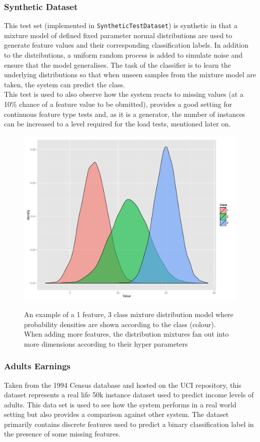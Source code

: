 \documentclass[a4paper,11pt]{scrreprt}
\begin{document}
\subsubsection{Synthetic Dataset}
This test set (implemented in \verb|SyntheticTestDataset|) is synthetic in that a mixture model of defined fixed parameter normal distributions are used to generate feature values and their corresponding classification labels. In addition to the distributions, a uniform random process is added to simulate noise and ensure that the model generalises. The task of the classifier is to learn the underlying distributions so that when unseen samples from the mixture model are taken, the system can predict the class.\\ This test is used to also observe how the system reacts to missing values (at a 10\% chance of a feature value to be obmitted), provides a good setting for continuous feature type tests and, as it is a generator, the number of instances can be increased to a level required for the load tests, mentioned later on.
\begin{figure}[h!]
\centering
\caption{An example of a 1 feature, 3 class mixture distribution model where probability densities are shown according to the class (colour). When adding more features, the distribution mixtures fan out into more dimensions according to their hyper parameters}
\includegraphics[scale=0.35, trim=0 0 0 0, clip=true] {synthetic-class-distributions.pdf}
\label{fig:indexes}
\end{figure}
\subsubsection{Adults Earnings} 
Taken from the 1994 Census database and hosted on the UCI repository, this dataset represents a real life 50k instance dataset used to predict income levels of adults. This data set is used to see how the system performs in a real world setting but also provides a comparison against other system. The dataset primarily contains discrete features used to predict a binary classification label in the presence of some missing features.
\end{document}
